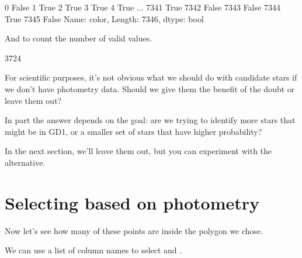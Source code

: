 \documentclass[letterpaper,10pt,english]{sphinxmanual}
\begin{document}
\begin{sphinxVerbatim}[commandchars=\\\{\}]
0       False
1        True
2        True
3        True
4        True
        ...  
7341     True
7342    False
7343    False
7344     True
7345    False
Name: color, Length: 7346, dtype: bool
\end{sphinxVerbatim}

And  to count the number of valid values.

\begin{sphinxVerbatim}[commandchars=\\\{\}]
\PYG{p}{[}\PYG{p}{]}
\end{sphinxVerbatim}

\begin{sphinxVerbatim}[commandchars=\\\{\}]
3724
\end{sphinxVerbatim}

For scientific purposes, it’s not obvious what we should do with candidate stars if we don’t have photometry data.  Should we give them the benefit of the doubt or leave them out?

In part the answer depends on the goal: are we trying to identify more stars that might be in GD\sphinxhyphen{}1, or a smaller set of stars that have higher probability?

In the next section, we’ll leave them out, but you can experiment with the alternative.


\section{Selecting based on photometry}
\label{\detokenize{06_photo:selecting-based-on-photometry}}
Now let’s see how many of these points are inside the polygon we chose.

We can use a list of column names to select  and .

\begin{sphinxVerbatim}[commandchars=\\\{\}]
  \PYG{p}{[}\PYG{p}{[} \PYG{p}{]}\PYG{p}{]}
\end{sphinxVerbatim}
\end{document}
